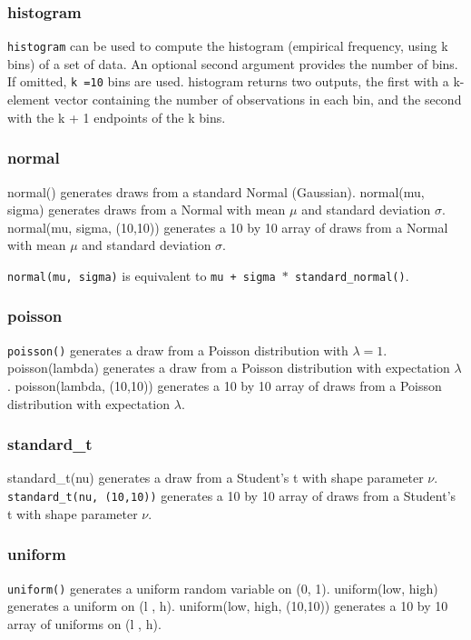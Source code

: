 \documentclass[KSmain.tex]{subfiles}
\begin{document}
\subsubsection{histogram}
\texttt{histogram} can be used to compute the histogram (empirical frequency, using k bins) of a set of data. An
optional second argument provides the number of bins. If omitted, \texttt{k =10} bins are used. histogram returns
two outputs, the first with a k-element vector containing the number of observations in each bin, and the
second with the k + 1 endpoints of the k bins.

\subsubsection{normal}
normal() generates draws from a standard Normal (Gaussian). normal(mu, sigma) generates draws from
a Normal with mean $\mu$ and standard deviation $\sigma$. normal(mu, sigma, (10,10)) generates a 10 by 10 array
of draws from a Normal with mean $\mu$ and standard deviation $\sigma$. 

\texttt{normal(mu, sigma)} is equivalent to \texttt{mu + sigma $\ast$ standard\_normal()}.
\subsubsection{poisson}
\texttt{poisson()} generates a draw from a Poisson distribution with $\lambda = 1$. poisson(lambda) generates a draw
from a Poisson distribution with expectation $\lambda$. poisson(lambda, (10,10)) generates a 10 by 10 array of
draws from a Poisson distribution with expectation $\lambda$.
\subsubsection{standard\_t}
standard\_t(nu) generates a draw from a Student’s t with shape parameter $\nu$. \texttt{standard\_t(nu, (10,10))}
generates a 10 by 10 array of draws from a Student’s t with shape parameter $\nu$.
\subsubsection{uniform}
\texttt{uniform()} generates a uniform random variable on (0, 1). uniform(low, high) generates a uniform on
(l , h). uniform(low, high, (10,10)) generates a 10 by 10 array of uniforms on (l , h).
\newpage
\end{document}
